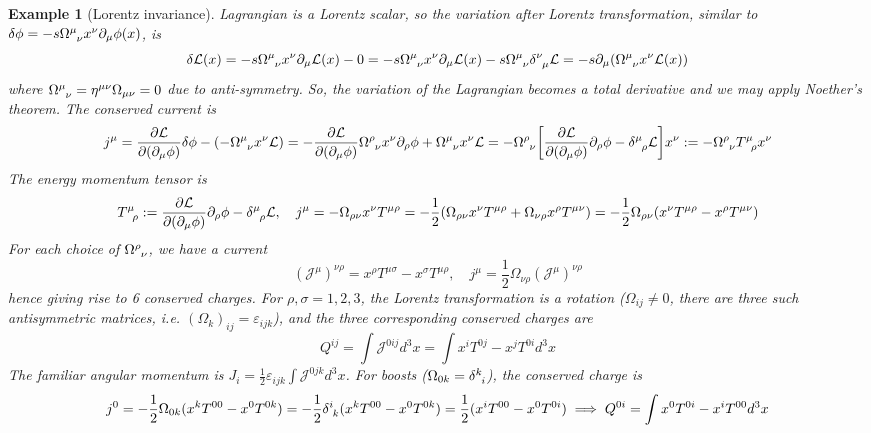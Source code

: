 \documentclass[a4paper]{article}
\newtheorem{eg}{Example}[section]
\theoremstyle{new}
\begin{document}
\begin{eg}[Lorentz invariance]
Lagrangian is a Lorentz scalar, so the variation after Lorentz transformation, similar to $\delta\phi=-s\tensor*{\Omega}{*_{}^{\mu}_{\nu}}x^\nu\partial_\mu\phi(x)$, is
$$\delta\mathcal{L}(x)=-s\tensor*{\Omega}{*_{}^{\mu}_{\nu}}x^\nu\partial_\mu\mathcal{L}(x)-0=-s\tensor*{\Omega}{*_{}^{\mu}_{\nu}}x^\nu\partial_\mu\mathcal{L}(x)-s\tensor*{\Omega}{*_{}^{\mu}_{\nu}}\tensor*{\delta}{*_{}^{\nu}_{\mu}}\mathcal{L}=-s\partial_\mu(\tensor*{\Omega}{*_{}^{\mu}_{\nu}}x^\nu\mathcal{L}(x))$$
where $\tensor*{\Omega}{*_{}^{\mu}_{\nu}}=\eta^{\mu\nu}\Omega_{\mu\nu}=0$ due to anti-symmetry. So, the variation of the Lagrangian becomes a total derivative and we may apply Noether's theorem. The conserved current is
$$j^\mu=\frac{\partial\mathcal{L}}{\partial(\partial_\mu\phi)}\delta\phi-(-\tensor*{\Omega}{*_{}^{\mu}_{\nu}} x^\nu\mathcal{L})=-\frac{\partial\mathcal{L}}{\partial(\partial_\mu\phi)}\tensor*{\Omega}{*_{}^{\rho}_{\nu}}x^\nu\partial_\rho\phi+\tensor*{\Omega}{*_{}^{\mu}_{\nu}}x^\nu\mathcal{L}=-\tensor*{\Omega}{*_{}^{\rho}_{\nu}}\bigg[\frac{\partial\mathcal{L}}{\partial(\partial_\mu\phi)}\partial_\rho\phi-\tensor*{\delta}{*_{}^{\mu}_{\rho}}\mathcal{L}\bigg]x^\nu:=-\tensor*{\Omega}{*_{}^{\rho}_{\nu}}\tensor*{T}{*_{}^{\mu}_{\rho}}x^\nu$$
The energy momentum tensor is
$$\tensor*{T}{*_{}^{\mu}_{\rho}}:=\frac{\partial\mathcal{L}}{\partial(\partial_\mu\phi)}\partial_\rho\phi-\tensor*{\delta}{*_{}^{\mu}_{\rho}}\mathcal{L},\quad j^\mu=-\Omega_{\rho\nu}x^\nu T^{\mu\rho}=-\frac{1}{2}(\Omega_{\rho\nu}x^\nu T^{\mu\rho}+\Omega_{\nu\rho}x^\rho T^{\mu\nu})=-\frac{1}{2}\Omega_{\rho\nu}(x^\nu T^{\mu\rho}-x^\rho T^{\mu\nu})$$
For each choice of $\tensor*{\Omega}{*_{}^{\rho}_{\nu}}$, we have a current
$$(\mathcal{J}^\mu)^{\nu\rho}=x^\rho T^{\mu\sigma}-x^\sigma T^{\mu\rho},\quad j^\mu=\frac{1}{2}\Omega_{\nu\rho}(\mathcal{J}^\mu)^{\nu\rho}$$
hence giving rise to 6 conserved charges. For $\rho,\sigma=1,2,3$, the Lorentz transformation is a rotation ($\Omega_{ij}\neq 0$, there are three such antisymmetric matrices, i.e. $(\Omega_k)_{ij}=\varepsilon_{ijk}$), and the three corresponding conserved charges are 
$$Q^{ij}=\int\mathcal{J}^{0ij}d^3x=\int x^iT^{0j}-x^jT^{0i}d^3x$$
The familiar angular momentum is $J_i=\frac{1}{2}\varepsilon_{ijk}\int\mathcal{J}^{0jk}d^3x$. For boosts ($\Omega_{0k}=\tensor*{\delta}{*_{}^{k}_{i}}$), the conserved charge is
$$j^0=-\frac{1}{2}\Omega_{0k}(x^kT^{00}-x^0T^{0k})=-\frac{1}{2}\tensor*{\delta}{*_{}^{i}_{k}}(x^kT^{00}-x^0T^{0k})=\frac{1}{2}(x^iT^{00}-x^0T^{0i})\implies Q^{0i}=\int x^0T^{0i}-x^iT^{00}d^3x$$

\end{eg}
\end{document}

